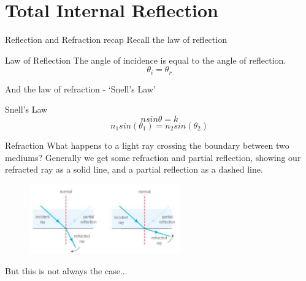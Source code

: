 \documentclass[../Main.tex]{subfiles}
\begin{document}
\author{Total Internal Reflection} %
\date{Year 1 Topic 17} %

\section{Total Internal Reflection} %

\begin{frame}{Reflection and Refraction recap}
    Recall the law of reflection \pause
    \begin{block}{Law of Reflection}
    The angle of incidence is equal to the angle of reflection. \begin{equation*}
        \theta_i = \theta_r
    \end{equation*}
    \end{block}
    And the law of refraction - `Snell's Law' \pause
    \begin{block}{Snell's Law}
    \begin{equation*}
        n sin \theta = k
    \end{equation*} 
    \begin{equation*}
        n_1 sin(\theta_1) = n_2 sin(\theta_2)
    \end{equation*}
    \end{block}
\end{frame}

\begin{frame}{Refraction}
    What happens to a light ray crossing the boundary between two mediums? \pause 
    \newline \newline
    Generally we get some refraction and partial reflection, showing our refracted ray as a solid line, and a partial reflection as a dashed line. 
    
    \begin{figure}
        \centering
        \includegraphics[height=3cm]{Waves_Images/lawofrefraction.jpg}
    \end{figure}
    
    But this is not always the case...
\end{frame}
\end{document}

